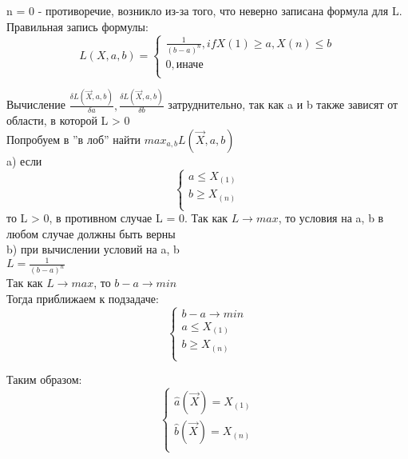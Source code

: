 n = 0 - противоречие, возникло из-за того, что неверно записана формула для L.\\
Правильная запись формулы:\\
\begin{equation}
L(X, a, b) = 
\begin{cases}
\frac{1}{(b - a)^{n}}, if X(1) \geqslant a, X(n) \leqslant b\\
0, \text{иначе}\\
\end{cases}
\end{equation}

Вычисление $\frac{\delta L(\overrightarrow{X}, a, b)}{\delta a}, \frac{\delta L(\overrightarrow{X}, a, b)}{\delta b}$ затруднительно, так как a и b также зависят от области, в которой L > 0\\
Попробуем в ''в лоб'' найти $max_{a,b} L(\overrightarrow{X},a,b)$\\
a) если\\
\begin{equation}
\begin{cases}
a \leqslant X_{(1)}\\
b \geqslant X_{(n)}\\
\end{cases}
\end{equation}
то L > 0, в противном случае L = 0. Так как $L \rightarrow max$, то условия на a, b в любом случае должны быть верны\\
b) при вычислении условий на a, b\\
$L = \frac{1}{(b - a)^{n}}$\\
Так как $L \rightarrow max$, то $b - a \rightarrow min$\\
Тогда приближаем к подзадаче:
\begin{equation}
\begin{cases}
b - a \rightarrow min\\
a \leqslant X_{(1)}\\
b \geqslant X_{(n)}\\
\end{cases}
\end{equation}

Таким образом:
\begin{equation}
\begin{cases}
\hat{a}(\overrightarrow{X}) = X_{(1)}\\
\hat{b}(\overrightarrow{X}) = X_{(n)}\\
\end{cases}
\end{equation}

